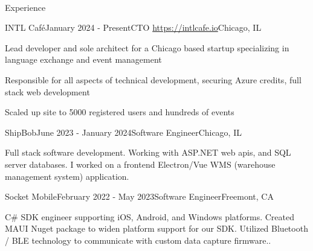 \documentclass[
	11pt, %
]{resume} %
\begin{document}
\begin{center}
\fontsize{20pt}{20pt}
\href{https://github.com/mattdrobbins}{} \ \ \
\href{https://www.linkedin.com/in/matt-robbins-developer/}{} 
\end{center}


\begin{rSection}{Experience}

	\begin{rSubsection}{INTL Café}{January 2024 - Present}{CTO  \url{https://intlcafe.io}}{Chicago, IL}
		\item Lead developer and sole architect for a Chicago based startup specializing in language exchange and event management
		\item Responsible for all aspects of technical development, securing Azure credits, full stack web development
		\item Scaled up site to 5000 registered users and hundreds of events		
	\end{rSubsection}


	\begin{rSubsection}{ShipBob}{June 2023 - January 2024}{Software Engineer}{Chicago, IL}
		\item Full stack software development. Working with ASP.NET web apis, and SQL server databases. I worked on a frontend Electron/Vue WMS (warehouse management system) application.		
	\end{rSubsection}


	\begin{rSubsection}{Socket Mobile}{February 2022 - May 2023}{Software Engineer}{Freemont, CA}
		\item C\# SDK engineer supporting iOS, Android, and Windows platforms. Created MAUI Nuget package to widen platform support for our SDK. Utilized Bluetooth / BLE technology to communicate with custom data capture firmware..		
	\end{rSubsection}



\end{rSection}
\end{document}
